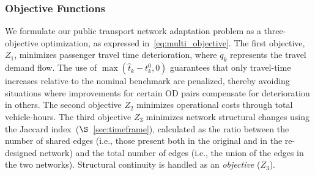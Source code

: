\documentclass[a4paper,fleqn]{cas-sc}
\begin{document}
\subsubsection{Objective Functions}
\label{sec:obj}
We formulate our public transport network adaptation problem as a three-objective optimization, as expressed in~\eqref{eq:multi_objective}. The first objective, $Z_1$, minimizes passenger travel time deterioration, where $q_k$ represents the travel demand flow. 
The use of $\max(\hat{t}_k - t_k^0, 0)$ guarantees that only travel-time increases relative to the nominal benchmark are penalized, thereby avoiding situations where improvements for certain OD pairs compensate for deterioration in others. 
%
The second objective $Z_2$ minimizes operational costs through total vehicle-hours.
%
The third objective $Z_3$ minimizes network structural changes using the Jaccard index~($\S$~\ref{sec:timeframe}), calculated as the ratio between the number of shared edges (i.e., those present both in the original and in the re-designed network) and the total number of edges (i.e., the union of the edges in the two networks).
%
Structural continuity is handled as an \emph{objective} ($Z_3$).

%
\end{document}
